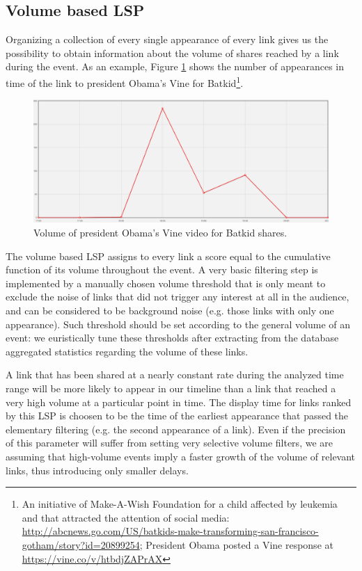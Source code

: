 \documentclass{sig-alternate}
\begin{document}
\subsection{Volume based LSP}
\label{sec:volume_based_links_selection}
Organizing a collection of every single appearance of every link gives us the possibility to obtain information about the volume of shares reached by a link during the event. As an example, Figure \ref{fig:batkid_whitehouse_volume} shows the number of appearances in time of the link to president Obama's Vine for Batkid\footnote{An initiative of Make-A-Wish Foundation for a child affected by leukemia and that attracted the attention of social media: \url{http://abcnews.go.com/US/batkids-make-transforming-san-francisco-gotham/story?id=20899254}; President Obama posted a Vine response at \url{https://vine.co/v/htbdjZAPrAX}}.
\begin{figure}[htbp]
  \centering
  \includegraphics[width=\linewidth]{Figures/batkid_whitehouse_volume.png}
  \caption{Volume of president Obama's Vine video for Batkid shares.}
  \label{fig:batkid_whitehouse_volume}
\end{figure}

The volume based LSP assigns to every link a score equal to the cumulative function of its volume throughout the event. A very basic filtering step is implemented by a manually chosen volume threshold that is only meant to exclude the noise of links that did not trigger any interest at all in the audience, and can be considered to be background noise (e.g. those links with only one appearance). Such threshold should be set according to the general volume of an event: we euristically tune these thresholds after extracting from the database aggregated statistics regarding the volume of these links.

A link that has been shared at a nearly constant rate during the analyzed time range will be more likely to appear in our timeline than a link that reached a very high volume at a particular point in time. The display time for links ranked by this LSP is choosen to be the time of the earliest appearance that passed the elementary filtering (e.g. the second appearance of a link). Even if the precision of this parameter will suffer from setting very selective volume filters, we are assuming that high-volume events imply a faster growth of the volume of relevant links, thus introducing only smaller delays.
\end{document}
